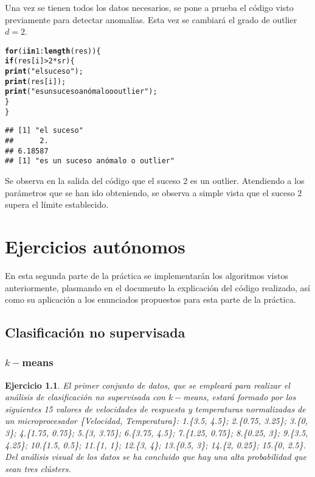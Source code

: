 \documentclass[12pt]{report}\usepackage[]{graphicx}\usepackage[dvipsnames]{xcolor}
\makeatletter
\newcommand{\hlnum}[1]{\textcolor[rgb]{0.686,0.059,0.569}{#1}}%
\newcommand{\hlstr}[1]{\textcolor[rgb]{0.192,0.494,0.8}{#1}}%
\newcommand{\hlopt}[1]{\textcolor[rgb]{0,0,0}{#1}}%
\newcommand{\hlstd}[1]{\textcolor[rgb]{0.345,0.345,0.345}{#1}}%
\newcommand{\hlkwa}[1]{\textcolor[rgb]{0.161,0.373,0.58}{\textbf{#1}}}%
\newcommand{\hlkwd}[1]{\textcolor[rgb]{0.737,0.353,0.396}{\textbf{#1}}}%
\newenvironment{kframe}{%
 \def\at@end@of@kframe{}%
 \ifinner\ifhmode%
  \def\at@end@of@kframe{\end{minipage}}%
  \begin{minipage}{\columnwidth}%
 \fi\fi%
 \def\FrameCommand##1{\hskip\@totalleftmargin \hskip-\fboxsep
 \colorbox{shadecolor}{##1}\hskip-\fboxsep
     \hskip-\linewidth \hskip-\@totalleftmargin \hskip\columnwidth}%
 \MakeFramed {\advance\hsize-\width
   \@totalleftmargin\z@ \linewidth\hsize
   \@setminipage}}%
 {\par\unskip\endMakeFramed%
 \at@end@of@kframe}
\newenvironment{knitrout}{}{} %
\newtheorem{exercise}{Ejercicio}[section]
\makeatother
\begin{document}
			 Una vez se tienen todos los datos necesarios, se pone a prueba el código visto previamente para detectar anomalías. Esta vez se cambiará el grado de outlier $d = 2$.
			 
\begin{knitrout}
\color{fgcolor}\begin{kframe}
\begin{alltt}
\hlkwa{for} \hlstd{(i} \hlkwa{in} \hlnum{1}\hlopt{:}\hlkwd{length}\hlstd{(res))\{}
        \hlkwa{if}\hlstd{(res[i]}\hlopt{>}\hlnum{2}\hlopt{*}\hlstd{sr)\{}
                \hlkwd{print}\hlstd{(}\hlstr{"el suceso"}\hlstd{);}
                \hlkwd{print}\hlstd{(res[i]);}
                \hlkwd{print}\hlstd{(}\hlstr{"es un suceso anómalo o outlier"}\hlstd{);}
                                 \hlstd{\}}
\hlstd{\}}
\end{alltt}
\begin{verbatim}
## [1] "el suceso"
##      2. 
## 6.18587 
## [1] "es un suceso anómalo o outlier"
\end{verbatim}
\end{kframe}
\end{knitrout}
			 
			 Se observa en la salida del código que el suceso 2 es un outlier. Atendiendo a los parámetros que se han ido obteniendo, se observa a simple vista que el suceso 2 supera el límite establecido. 
	 
	 \chapter{Ejercicios autónomos}
	 
		 En esta segunda parte de la práctica se implementarán los algoritmos vistos anteriormente, plasmando en el documento la explicación del código realizado, así como su aplicación a los enunciados propuestos para esta parte de la práctica.
		 
		 \section{Clasificación no supervisada}
		 
		 	\subsection{$k-$means}
		 
				 \begin{exercise}\label{ex:kmeans}
					 	El primer conjunto de datos, que se empleará para realizar el análisis de clasificación no supervisada con $k-$means, estará formado por los siguientes 15 valores de velocidades de respuesta y temperaturas normalizadas de un microprocesador \{Velocidad, Temperatura\}: 1.\{3.5, 4.5\}; 2.\{0.75, 3.25\}; 3.\{0, 3\}; 4.\{1.75, 0.75\}; 5.\{3, 3.75\}; 6.\{3.75, 4.5\}; 7.\{1.25, 0.75\}; 8.\{0.25, 3\}; 9.\{3.5, 4.25\}; 10.\{1.5, 0.5\}; 11.\{1, 1\}; 12.\{3, 4\}; 13.\{0.5, 3\}; 14.\{2, 0.25\}; 15.\{0, 2.5\}. Del análisis visual de los datos se ha concluido que hay una alta probabilidad que sean tres clústers.
				 \end{exercise}
				 
\end{document}
